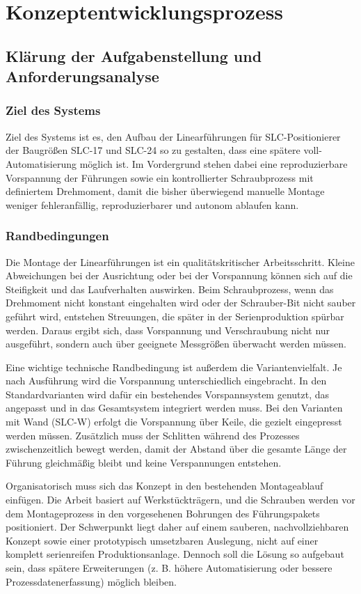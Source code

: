 \section{Konzeptentwicklungsprozess}
\subsection{Klärung der Aufgabenstellung und Anforderungsanalyse}
\subsubsection{Ziel des Systems}
Ziel des Systems ist es, den Aufbau der Linearführungen für SLC-Positionierer der Baugrößen SLC-17 und SLC-24 so zu gestalten, dass eine spätere voll-Automatisierung möglich ist. Im Vordergrund stehen dabei eine reproduzierbare Vorspannung der Führungen sowie ein kontrollierter Schraubprozess mit definiertem Drehmoment, damit die bisher überwiegend manuelle Montage weniger fehleranfällig, reproduzierbarer und autonom ablaufen kann.

\subsubsection{Randbedingungen}
Die Montage der Linearführungen ist ein qualitätskritischer Arbeitsschritt. Kleine Abweichungen bei der Ausrichtung oder bei der Vorspannung können sich auf die Steifigkeit und das Laufverhalten auswirken. Beim Schraubprozess, wenn das Drehmoment nicht konstant eingehalten wird oder der Schrauber-Bit nicht sauber geführt wird, entstehen Streuungen, die später in der Serienproduktion spürbar werden. Daraus ergibt sich, dass Vorspannung und Verschraubung nicht nur ausgeführt, sondern auch über geeignete Messgrößen überwacht werden müssen.

Eine wichtige technische Randbedingung ist außerdem die Variantenvielfalt. Je nach Ausführung wird die Vorspannung unterschiedlich eingebracht. In den Standardvarianten wird dafür ein bestehendes Vorspannsystem genutzt, das angepasst und in das Gesamtsystem integriert werden muss. Bei den Varianten mit Wand (SLC-W) erfolgt die Vorspannung über Keile, die gezielt eingepresst werden müssen. Zusätzlich muss der Schlitten während des Prozesses zwischenzeitlich bewegt werden, damit der Abstand über die gesamte Länge der Führung gleichmäßig bleibt und keine Verspannungen entstehen.

Organisatorisch muss sich das Konzept in den bestehenden Montageablauf einfügen. Die Arbeit basiert auf Werkstückträgern, und die Schrauben werden vor dem Montageprozess in den vorgesehenen Bohrungen des Führungspakets positioniert. Der Schwerpunkt liegt daher auf einem sauberen, nachvollziehbaren Konzept sowie einer prototypisch umsetzbaren Auslegung, nicht auf einer komplett serienreifen Produktionsanlage. Dennoch soll die Lösung so aufgebaut sein, dass spätere Erweiterungen (z. B. höhere Automatisierung oder bessere Prozessdatenerfassung) möglich bleiben.

